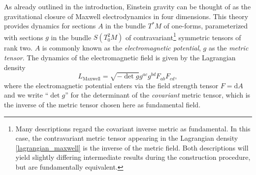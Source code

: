 As already outlined in the introduction, Einstein gravity can be thought of as the gravitational closure of Maxwell electrodynamics in four dimensions. This theory provides dynamics for sections $A$ in the bundle $T^\ast M$ of one-forms, parameterized with sections $g$ in the bundle $S(T^2_0M)$ of contravariant\footnote{Many descriptions regard the covariant inverse metric as fundamental. In this case, the contravariant metric tensor appearing in the Lagrangian density \eqref{lagrangian_maxwell} is the inverse of the metric field. Both descriptions will yield slightly differing intermediate results during the construction procedure, but are fundamentally equivalent.} symmetric tensors of rank two. $A$ is commonly known as the \emph{electromagnetic potential}, $g$ as the \emph{metric tensor}. The dynamics of the electromagnetic field is given by the Lagrangian density
\begin{equation}\label{lagrangian_maxwell}
  L_\text{Maxwell} = \sqrt{-\operatorname{det} g} g^{ac}g^{bd} F_{ab} F_{cd},
\end{equation}
where the electromagnetic potential enters via the field strength tensor $F = \mathrm dA$ and we write ``$\operatorname{det}g$'' for the determinant of the \emph{covariant} metric tensor, which is the inverse of the metric tensor chosen here as fundamental field.

